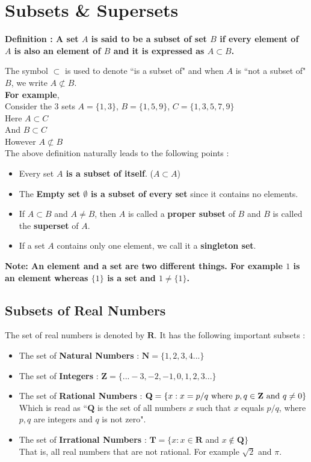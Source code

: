 \documentclass[12pt, letterpaper]{article}
\begin{document}
\section{Subsets \& Supersets}
\begin{displayquote}
\textbf{Definition : A set $A$ is said to be a subset of set $B$ if every element of $A$ is also an element of $B$ and it is expressed as $A \subset B$.}
\end{displayquote}
The symbol $\subset$ is used to denote ``is a subset of" and when $A$ is ``not a subset of" $B$, we write $A \not \subset B$.\\
\textbf{For example},\\ 
Consider the 3 sets $A = \{1,3\}$, $B = \{1,5,9\}$, $C = \{1,3,5,7,9\}$\\
Here $A \subset C$\\
And $B \subset C$\\
However $A \not \subset B$\\
The above definition naturally leads to the following points : 
\begin{itemize}
    \item Every set \textbf{$A$ is a subset of itself}. ($A \subset A$)
    \item The \textbf{Empty set $\emptyset$ is a subset of every set} since it contains no elements.
    \item If $A \subset B$ and $A \neq B$, then $A$ is called a \textbf{proper subset} of $B$ and $B$ is called the \textbf{superset} of $A$.
    \item If a set $A$ contains only one element, we call it a \textbf{singleton set}.
\end{itemize}
\begin{displayquote}
\textbf{Note: An element and a set are two different things. For example $1$ is an element whereas $\{1\}$ is a set and $1 \neq \{1\}$.}
\end{displayquote}

\subsection{Subsets of Real Numbers}
The set of real numbers is denoted by $\mathbf{R}$. It has the following important subsets : 
\begin{itemize}
    \item The set of \textbf{Natural Numbers} : $\mathbf{N} = \{1,2,3,4...\}$
    \item The set of \textbf{Integers} : $\mathbf{Z} = \{...-3,-2,-1,0,1,2,3...\}$
    \item The set of \textbf{Rational Numbers} : $\mathbf{Q} = \{ x : x = p/q \ \textnormal{where} \ p,q \in \mathbf{Z} \ \textnormal{and} \ q \neq 0 \}$ \\
    Which is read as ``$\mathbf{Q}$ is the set of all numbers $x$ such that $x$ equals $p/q$, where $p,q$ are integers and $q$ is not zero". 
    \item The set of \textbf{Irrational Numbers} : $\mathbf{T} = \{ x : x \in \mathbf{R}$ and $x \notin \mathbf{Q}\}$\\
    That is, all real numbers that are not rational. For example $\sqrt{2}$ and $\pi$.  
\end{itemize}
\end{document}
